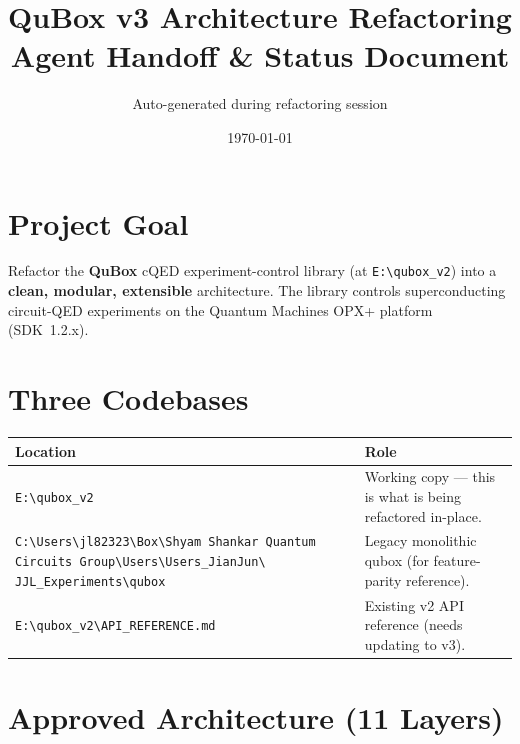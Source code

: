 \documentclass[11pt]{article}
\title{QuBox v3 Architecture Refactoring\\[0.3em]\large Agent Handoff \& Status Document}
\author{Auto-generated during refactoring session}
\date{\today}
\begin{document}
\maketitle
\tableofcontents
\newpage

\section{Project Goal}

Refactor the \textbf{QuBox} cQED experiment-control library (at \texttt{E:\textbackslash qubox\_v2})
into a \textbf{clean, modular, extensible} architecture.
The library controls superconducting circuit-QED experiments on the
Quantum Machines OPX+ platform (SDK~1.2.x).

\section{Three Codebases}

\begin{tabular}{lp{10cm}}
\toprule
\textbf{Location} & \textbf{Role} \\
\midrule
\texttt{E:\textbackslash qubox\_v2} &
  Working copy --- this is what is being refactored in-place. \\
\texttt{C:\textbackslash Users\textbackslash jl82323\textbackslash Box\textbackslash Shyam Shankar
  Quantum Circuits Group\textbackslash Users\textbackslash Users\_JianJun\textbackslash
  JJL\_Experiments\textbackslash qubox} &
  Legacy monolithic qubox (for feature-parity reference). \\
\texttt{E:\textbackslash qubox\_v2\textbackslash API\_REFERENCE.md} &
  Existing v2 API reference (needs updating to v3). \\
\bottomrule
\end{tabular}

\section{Approved Architecture (11 Layers)}
\end{document}
